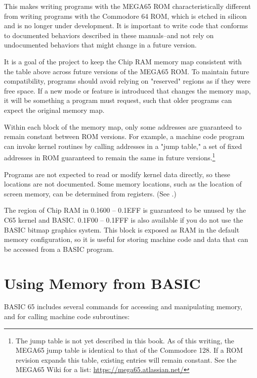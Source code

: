 This makes writing programs with the MEGA65 ROM characteristically different from
writing programs with the Commodore 64 ROM, which is etched in silicon and is
no longer under development. It is important to write code that conforms to
documented behaviors described in these manuals--and not rely on undocumented
behaviors that might change in a future version.

It is a goal of the project to keep the Chip RAM memory map consistent with the
table above across future versions of the MEGA65 ROM. To maintain future
compatibility, programs should avoid relying on "reserved" regions as if they
were free space. If a new mode or feature is introduced that changes the memory
map, it will be something a program must request, such that older programs can
expect the original memory map.

Within each block of the memory map, only some addresses are guaranteed to
remain constant between ROM versions. For example, a machine code program can
invoke kernel routines by calling addresses in a "jump table," a set of
fixed addresses in ROM guaranteed to remain the same in future
versions.\footnote{The jump table is not yet described in this book. As of this
writing, the MEGA65 jump table is identical to that of the
Commodore 128. If a ROM revision expands this table, existing entries will
remain constant. See the MEGA65 Wiki for a list: \url{https://mega65.atlassian.net/}}

Programs are not expected to read or modify kernel data directly, so
these locations are not documented. Some memory locations, such as the location
of screen memory, can be determined from registers. (See .)

The region of Chip RAM in 0.1600 -- 0.1EFF is guaranteed to be unused by the
C65 kernel and BASIC. 0.1F00 -- 0.1FFF is also available if you do not use the
BASIC bitmap graphics system. This block is exposed as RAM in the default memory
configuration, so it is useful for storing machine code and data that can be
accessed from a BASIC program.


\newpage
\section{Using Memory from BASIC}

BASIC 65 includes several commands for accessing and manipulating memory, and
for calling machine code subroutines:


